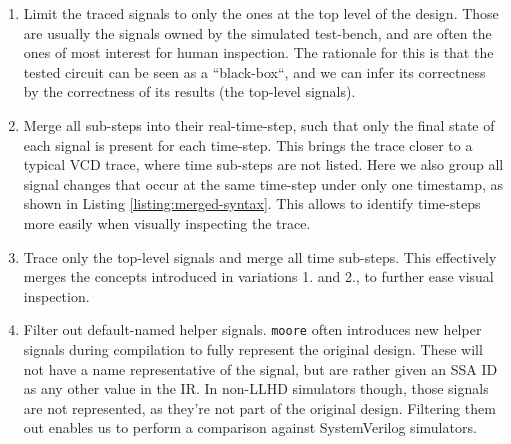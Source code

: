 \begin{enumerate}
    \item Limit the traced signals to only the ones at the top level of the design. Those are usually the signals owned by the simulated test-bench, and are often the ones of most interest for human inspection. The rationale for this is that the tested circuit can be seen as a “black-box“, and we can infer its correctness by the correctness of its results (the top-level signals).
    \item Merge all sub-steps into their real-time-step, such that only the final state of each signal is present for each time-step. This brings the trace closer to a typical VCD trace, where time sub-steps are not listed. Here we also group all signal changes that occur at the same time-step under only one timestamp, as shown in Listing \ref{listing:merged-syntax}. This allows to identify time-steps more easily when visually inspecting the trace.
    \item Trace only the top-level signals and merge all time sub-steps. This effectively merges the concepts introduced in variations 1. and 2., to further ease visual inspection.
    \item Filter out default-named helper signals. \texttt{moore} often introduces new helper signals during compilation to fully represent the original design. These will not have a name representative of the signal, but are rather given an SSA ID as any other value in the IR. In non-LLHD simulators though, those signals are not represented, as they're not part of the original design. Filtering them out enables us to perform a comparison against SystemVerilog simulators.
\end{enumerate}



